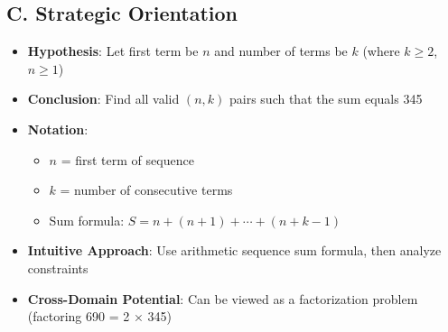 \documentclass[11pt]{article}
\begin{document}
\begin{problemconfigbox}
\subsection*{C. Strategic Orientation}
\begin{itemize}[leftmargin=*]
    \item \textbf{Hypothesis}: Let first term be $n$ and number of terms be $k$ (where $k \geq 2$, $n \geq 1$)
    \item \textbf{Conclusion}: Find all valid $(n, k)$ pairs such that the sum equals 345
    \item \textbf{Notation}: 
    \begin{itemize}
        \item $n$ = first term of sequence
        \item $k$ = number of consecutive terms
        \item Sum formula: $S = n + (n+1) + \cdots + (n+k-1)$
    \end{itemize}
    \item \textbf{Intuitive Approach}: Use arithmetic sequence sum formula, then analyze constraints
    \item \textbf{Cross-Domain Potential}: Can be viewed as a factorization problem (factoring 690 = 2 × 345)
\end{itemize}
\end{problemconfigbox}
\end{document}
